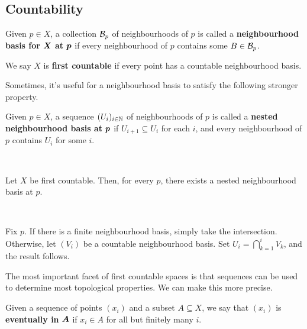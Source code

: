 \subsection{Countability}

\begin{defn}
    Given $ p \in X $, a collection $ \mathcal{B}_{p} $ of neighbourhoods of $ p $ is
    called a \textbf{neighbourhood basis for} $ \bm{X} $ \textbf{at}
    $ \bm{p} $ if every neighbourhood of $ p $ contains some $ B \in
    \mathcal{B}_{p} $.

    We say $ X $ is \textbf{first countable} if every point has a countable
    neighbourhood basis.
\end{defn}

Sometimes, it's useful for a neighbourhood basis to satisfy the following
stronger property.

\begin{defn}
    Given $ p \in X $, a sequence $ (U_{i})_{i\in\mathbb{N}} $ of neighbourhoods of
    $ p $ is called a \textbf{nested neighbourhood basis at} $ \bm{p} $ if
    $ U_{i+1} \subseteq U_{i} $ for each $ i $, and every neighbourhood of $ p $
    contains $ U_{i} $ for some $ i $.
\end{defn} \

\begin{lm}
    Let $ X $ be first countable. Then, for every $ p $, there exists a nested
    neighbourhood basis at $ p $.
\end{lm} \

\begin{pf}[source=Primary Source Material]
    Fix $ p $. If there is a finite neighbourhood basis, simply take the
    intersection. Otherwise, let $ (V_{i}) $ be a countable neighbourhood basis.
    Set $ U_{i} = \bigcap_{k=1}^{i}V_{k} $, and the result follows.
\end{pf}

The most important facet of first countable spaces is that sequences can be used
to determine most topological properties. We can make this more precise.

\begin{defn}
    Given a sequence of points $ (x_{i}) $ and a subset $ A \subseteq X $, we say
    that $ (x_{i}) $ is \textbf{eventually in} $ \bm{A} $ if $ x_{i} \in A $ for
    all but finitely many $ i $.
\end{defn} \

